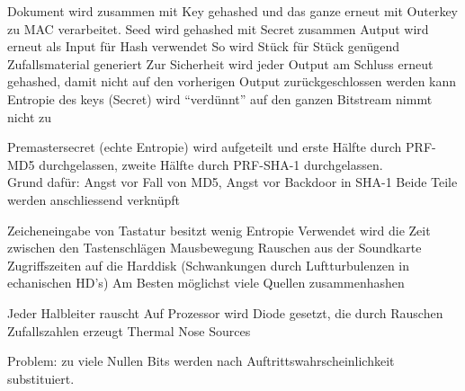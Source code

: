 \documentclass[ngerman,a4paper,12pt]{scrreprt}
\begin{document}
\ul
	\li Dokument wird zusammen mit Key gehashed und das ganze erneut mit Outerkey zu MAC verarbeitet.
\ulE
{}
\ul
	\li Seed wird gehashed mit Secret zusammen
	\li Autput wird erneut als Input für Hash verwendet
	\li So wird Stück für Stück genügend Zufallsmaterial generiert
	\li Zur Sicherheit wird jeder Output am Schluss erneut gehashed, damit nicht auf den vorherigen Output zurückgeschlossen werden kann
	\li Entropie des keys (Secret) wird ``verdünnt'' auf den ganzen Bitstream \ra nimmt nicht zu
\ulE
{}

\ul
	\li Premastersecret (echte Entropie) wird aufgeteilt und erste Hälfte durch PRF-MD5 durchgelassen, zweite Hälfte durch PRF-SHA-1 durchgelassen. \\
	 \li Grund dafür: Angst vor Fall von MD5, Angst vor Backdoor in SHA-1
	 \li Beide Teile werden anschliessend verknüpft
\ulE
{}


\ul
	\li Zeicheneingabe von Tastatur besitzt wenig Entropie \ra Verwendet wird die Zeit zwischen den Tastenschlägen
	\li Mausbewegung
	\li Rauschen aus der Soundkarte
	\li Zugriffszeiten auf die Harddisk (Schwankungen durch Luftturbulenzen in echanischen HD's)
	\li Am Besten möglichst viele Quellen zusammenhashen
\ulE
{}

\ul
	\li Jeder Halbleiter rauscht \ra Auf Prozessor wird Diode gesetzt, die durch Rauschen Zufallszahlen erzeugt
	\li Thermal Nose Sources
\ulE


\ul
	\li Problem: zu viele Nullen \ra Bits werden nach Auftrittswahrscheinlichkeit substituiert.
\ulE

\end{document}
